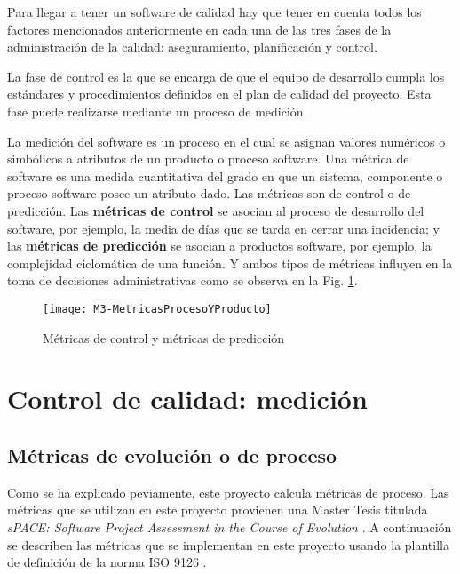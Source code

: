 
Para llegar a tener un software de calidad hay que tener en cuenta todos los factores mencionados anteriormente en cada una de las tres fases de la administración de la calidad: aseguramiento, planificación y control.

La fase de control es la que se encarga de que el equipo de desarrollo cumpla los estándares y procedimientos definidos en el plan de calidad del proyecto. Esta fase puede realizarse mediante un proceso de medición.

La medición del software es un proceso en el cual se asignan valores numéricos o simbólicos a atributos de un producto o proceso software. Una métrica de software es una medida cuantitativa del grado en que un sistema, componente o proceso software posee un atributo dado. Las métricas son de control o de predicción. Las \textbf{métricas de control} se asocian al proceso de desarrollo del software, por ejemplo, la media de días que se tarda en cerrar una incidencia; y las \textbf{métricas de predicción} se asocian a productos software, por ejemplo, la complejidad ciclomática de una función. Y ambos tipos de métricas influyen en la toma de decisiones administrativas como se observa en la Fig. \ref{fig:M3-MetricasProcesoYProducto}.
\begin{figure}[!h]
	\centering
	\texttt{[image: M3-MetricasProcesoYProducto]}
	\caption{Métricas de control y métricas de predicción\cite{sommerville_ingenierisoftware_2002}}\label{fig:M3-MetricasProcesoYProducto}
\end{figure}

\section{Control de calidad: medición}

\subsection{Métricas de evolución o de proceso}

Como se ha explicado peviamente, este proyecto calcula  métricas de proceso. Las métricas que se utilizan en este proyecto provienen una Master Tesis titulada \textit{sPACE: Software Project Assessment in the Course of Evolution} \cite{ratzinger_space:_2007}. 
A continuación se describen las métricas que se implementan en este proyecto usando la plantilla de definición de la norma ISO 9126 \cite{ISO9126}.\\

